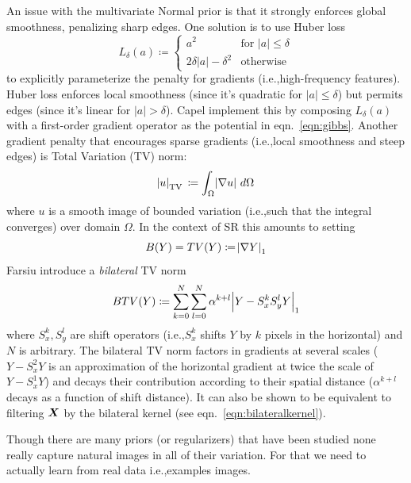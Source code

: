 An issue with the multivariate Normal prior is that it strongly enforces global smoothness, penalizing sharp edges.
%
One solution is to use Huber loss\cite{huber1964}
\begin{equation}
	L_{\delta }(a)\coloneqq {
		\begin{cases}
			a^2                                 & \text{for }\lvert a \rvert \leq \delta \\
			2 \delta \lvert a \rvert - \delta^2 & {\text{otherwise}}
		\end{cases}
	}
\end{equation}
to explicitly parameterize the penalty for gradients (i.e.,high-frequency features).
%
Huber loss enforces local smoothness (since it's quadratic for \(\lvert a \rvert \leq \delta\)) but permits edges (since it's linear for \(\lvert a \rvert > \delta\)).
%
Capel \etal\cite{capel2000} implement this by composing \(L_{\delta }(a)\) with a first-order gradient operator as the potential in eqn.~\eqref{eqn:gibbs}.
%
Another gradient penalty that encourages sparse gradients (i.e.,local smoothness and steep edges) is Total Variation (TV) norm\cite{RUDIN1992259}:
\begin{equation}
	\abs{u}_{\operatorname {TV}}\,\coloneqq\int _{\Omega }\abs{\nabla u}\,d\Omega
\end{equation}
where \(u\) is a smooth image of bounded variation (i.e.,such that the integral converges) over domain \(\Omega\).
%
In the context of SR this amounts to setting
\begin{equation}
	B(Y) = TV(Y) \coloneqq \abs{ \nabla Y }_1
\end{equation}
%
Farsiu \etal\cite{farsiu} introduce a \textit{bilateral} TV norm
\begin{equation}
	BTV(Y) \coloneqq \sum_{k=0}^{N} \sum_{l=0}^{N} \alpha^{k + l} \abs{ Y - S_x^k S_y^l Y }_1
\end{equation}
where \(S_x^k, S_y^l\) are shift operators (i.e.,\(S_x^k\) shifts \(Y\) by \(k\) pixels in the horizontal) and \(N\) is arbitrary.
%
The bilateral TV norm factors in gradients at several scales (\(Y - S_x^2 Y\) is an approximation of the horizontal gradient at twice the scale of \(Y - S_x^1 Y\)) and decays their contribution according to their spatial distance (\(\alpha^{k+l}\) decays as a function of shift distance).
%
It can also be shown to be equivalent\cite{elad2002} to filtering \(\bm{X}\) by the bilateral kernel (see eqn.~\eqref{eqn:bilateralkernel}).

Though there are many priors (or regularizers) that have been studied none really capture natural images in all of their variation.
%
For that we need to actually learn from real data i.e.,examples images.

